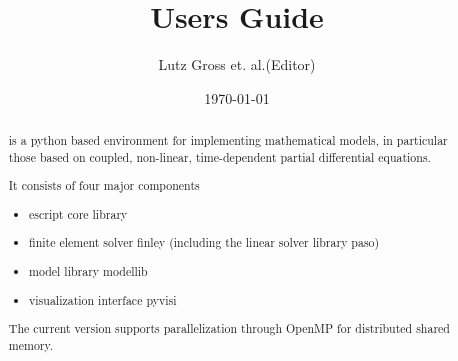 \documentclass{manual}
\title{\escript Users Guide}
\author{Lutz Gross et. al.(Editor)}
\date{\today}
\begin{document}
\maketitle



\begin{abstract}
\escript is a python based environment for implementing mathematical models, in particular those based on coupled, non-linear, time-dependent partial differential equations.

It consists of four major components
\begin{itemize}
\item escript core library
\item finite element solver finley (including the linear solver library paso)
\item model library modellib
\item visualization interface pyvisi
\end{itemize}
The current version supports parallelization through OpenMP for distributed shared memory. 
\end{abstract}

\tableofcontents








%


%

\makemodindex

\printindex
%



\end{document}
